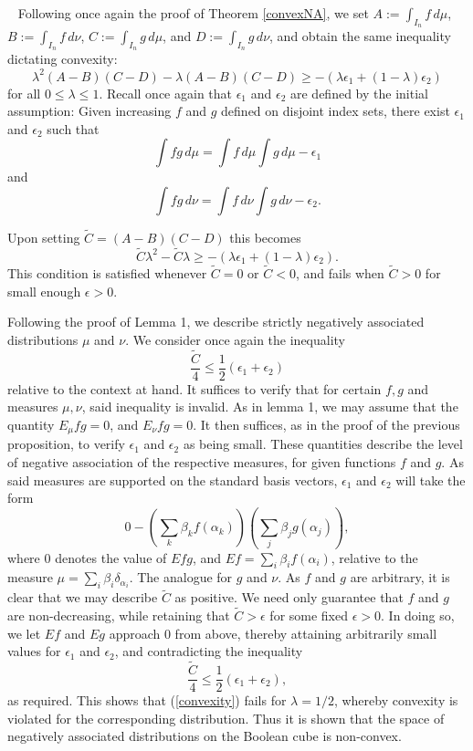 \documentclass[11pt]{article}
\newenvironment{Proof}{\noindent{\bf Proof} \ }{\QED}\smallskip
\newcommand\QED{\newline \rightline{$\blacksquare$} \bigskip}
\begin{document}
\begin{Proof}
Following once again the proof of Theorem \ref{convexNA}, we set  $A:= \int_{I_n} f\, d\mu$, 
$B:= \int_{I_n} f \, d\nu$, $C:= \int_{I_n} g \, d\mu$,
and $D := \int_{I_n} g\, d\nu$, and obtain the same inequality dictating convexity:
\[
\lambda^2(A-B)(C-D) -\lambda(A-B)(C-D) \geq 
-(\lambda\epsilon_1+(1-\lambda)\epsilon_2)
\]
for all $0\leq \lambda\leq 1$. Recall once again that $\epsilon_1$ and $\epsilon_2$ are defined by the initial assumption: Given increasing $f$ and $g$ defined on disjoint index sets,
there exist $\epsilon_1$ and $\epsilon_2$ such that 
\[
\int fg \, d\mu = \int f \, d\mu \int g \, d\mu -\epsilon_1
\]
and 
\[
\int fg \, d\nu = \int f \, d\nu \int g \, d\nu -\epsilon_2.
\]

Upon setting $\tilde{C} = (A-B)(C-D)$ this becomes
\[
\tilde{C}\lambda^2 - \tilde{C} \lambda\geq 
-(\lambda\epsilon_1+(1-\lambda)\epsilon_2).
\]
This condition is satisfied whenever $\tilde{C}=0$ or $\tilde{C}<0$, and fails when $\tilde{C}>0$ for small enough $\epsilon>0$.

Following the proof of Lemma 1, we describe strictly negatively associated distributions $\mu$ and $\nu$. We consider once again the inequality 
\[
\frac{\tilde{C}}{4} \leq \frac{1}{2}(\epsilon_1+\epsilon_2)
\]
relative to the context at hand. It suffices to verify that for certain $f,g$ and measures $\mu, \nu$, said inequality is invalid. As in lemma 1, we may assume that the quantity $E_{\mu}fg =0$, and $E_{\nu}fg = 0$. It then suffices, as in the proof of the previous proposition, to verify $\epsilon_1$ and $\epsilon_2$ as being small. These quantities describe the level of negative association of the respective measures, for given functions $f$ and $g$. As said measures are supported on the standard basis vectors, $\epsilon_1$ and $\epsilon_2$ will take the form
\[
0-\left(\sum_k \beta_k f(\alpha_k)\right)\left( \sum_j \beta_j g(\alpha_j)\right),
\]
where 0 denotes the value of $E fg$, and $Ef = \sum_i\beta_i f(\alpha_i)$, relative to the measure $\mu = \sum_i\beta_i \delta_{\alpha_i}$. The analogue for $g$ and $\nu$. As $f$ and $g$ are arbitrary, it is clear that we may describe $\tilde{C}$ as positive. We need only guarantee that $f$ and $g$ are non-decreasing, while retaining that $\tilde{C}>\epsilon$ for some fixed $\epsilon>0$. In doing so, we let $Ef$ and $Eg$ approach 0 from above, thereby attaining arbitrarily small values for $\epsilon_1$ and $\epsilon_2$, and contradicting the inequality 
\[
\frac{\tilde{C}}{4} \leq \frac{1}{2}(\epsilon_1+\epsilon_2),
\]
as required. This shows that (\ref{convexity}) fails for $\lambda=1/2$, whereby convexity is violated for the corresponding distribution.
Thus it is shown that the space of negatively associated distributions on the Boolean cube is non-convex.
\end{Proof}  
\end{document}
